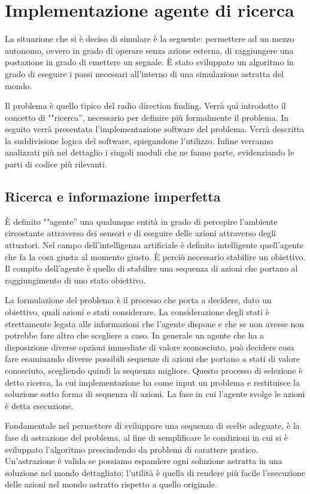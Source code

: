 \chapter{Implementazione agente di ricerca}
La situazione che si è deciso di simulare è la seguente: permettere ad un mezzo autonomo, ovvero in grado di operare senza azione esterna, di raggiungere una postazione in grado di emettere un segnale. È stato sviluppato un algoritmo in grado di eseguire i passi necessari all'interno di una simulazione astratta del mondo. 

Il problema è quello tipico del radio direction finding. Verrà qui introdotto il concetto di ""ricerca'', necessario per definire più formalmente il problema. In seguito verrà presentata l'implementazione software del problema. Verrà descritta la suddivisione logica del software, spiegandone l'utilizzo. Infine verranno analizzati più nel dettaglio i singoli moduli che ne fanno parte, evidenziando le parti di codice più rilevanti.

\section{Ricerca e informazione imperfetta}
È definito ""agente'' una qualunque entità in grado di percepire l'ambiente circostante attraverso dei sensori e di eseguire delle azioni attraverso degli attuatori. Nel campo dell'intelligenza artificiale è definito intelligente quell'agente che fa la cosa giusta al momento giusto. È perciò necessario stabilire un obiettivo. Il compito dell'agente è quello di stabilire una sequenza di azioni che portano al raggiungimento di uno stato obiettivo. 

La formulazione del problema è il processo che porta a decidere, dato un obiettivo, quali azioni e stati considerare. La considerazione degli stati è strettamente legata alle informazioni che l'agente dispone e che se non avesse non potrebbe fare altro che scegliere a caso. In generale un agente che ha a disposizione diverse opzioni immediate di valore sconosciuto, può decidere cosa fare esaminando diverse possibili sequenze di azioni che portano a stati di valore conosciuto, scegliendo quindi la sequenza migliore. Questo processo di selezione è detto ricerca, la cui implementazione ha come input un problema e restituisce la soluzione sotto forma di sequenza di azioni. La fase in cui l'agente svolge le azioni è detta esecuzione.

Fondamentale nel permettere di sviluppare una sequenza di scelte adeguate, è la fase di astrazione del problema, al fine di semplificare le condizioni in cui si è sviluppato l'algoritmo prescindendo da problemi di carattere pratico. Un'astrazione è valida se possiamo espandere ogni soluzione astratta in una soluzione nel mondo dettagliato; l'utilità è quella di rendere più facile l'esecuzione delle azioni nel mondo astratto rispetto a quello originale. 

